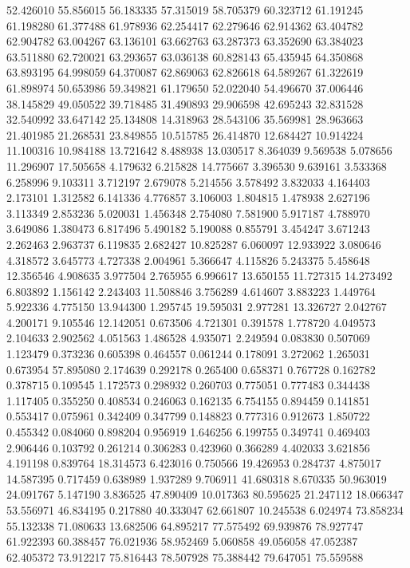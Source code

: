 52.426010
55.856015
56.183335
57.315019
58.705379
60.323712
61.191245
61.198280
61.377488
61.978936
62.254417
62.279646
62.914362
63.404782
62.904782
63.004267
63.136101
63.662763
63.287373
63.352690
63.384023
63.511880
62.720021
63.293657
63.036138
60.828143
65.435945
64.350868
63.893195
64.998059
64.370087
62.869063
62.826618
64.589267
61.322619
61.898974
50.653986
59.349821
61.179650
52.022040
54.496670
37.006446
38.145829
49.050522
39.718485
31.490893
29.906598
42.695243
32.831528
32.540992
33.647142
25.134808
14.318963
28.543106
35.569981
28.963663
21.401985
21.268531
23.849855
10.515785
26.414870
12.684427
10.914224
11.100316
10.984188
13.721642
8.488938
13.030517
8.364039
9.569538
5.078656
11.296907
17.505658
4.179632
6.215828
14.775667
3.396530
9.639161
3.533368
6.258996
9.103311
3.712197
2.679078
5.214556
3.578492
3.832033
4.164403
2.173101
1.312582
6.141336
4.776857
3.106003
1.804815
1.478938
2.627196
3.113349
2.853236
5.020031
1.456348
2.754080
7.581900
5.917187
4.788970
3.649086
1.380473
6.817496
5.490182
5.190088
0.855791
3.454247
3.671243
2.262463
2.963737
6.119835
2.682427
10.825287
6.060097
12.933922
3.080646
4.318572
3.645773
4.727338
2.004961
5.366647
4.115826
5.243375
5.458648
12.356546
4.908635
3.977504
2.765955
6.996617
13.650155
11.727315
14.273492
6.803892
1.156142
2.243403
11.508846
3.756289
4.614607
3.883223
1.449764
5.922336
4.775150
13.944300
1.295745
19.595031
2.977281
13.326727
2.042767
4.200171
9.105546
12.142051
0.673506
4.721301
0.391578
1.778720
4.049573
2.104633
2.902562
4.051563
1.486528
4.935071
2.249594
0.083830
0.507069
1.123479
0.373236
0.605398
0.464557
0.061244
0.178091
3.272062
1.265031
0.673954
57.895080
2.174639
0.292178
0.265400
0.658371
0.767728
0.162782
0.378715
0.109545
1.172573
0.298932
0.260703
0.775051
0.777483
0.344438
1.117405
0.355250
0.408534
0.246063
0.162135
6.754155
0.894459
0.141851
0.553417
0.075961
0.342409
0.347799
0.148823
0.777316
0.912673
1.850722
0.455342
0.084060
0.898204
0.956919
1.646256
6.199755
0.349741
0.469403
2.906446
0.103792
0.261214
0.306283
0.423960
0.366289
4.402033
3.621856
4.191198
0.839764
18.314573
6.423016
0.750566
19.426953
0.284737
4.875017
14.587395
0.717459
0.638989
1.937289
9.706911
41.680318
8.670335
50.963019
24.091767
5.147190
3.836525
47.890409
10.017363
80.595625
21.247112
18.066347
53.556971
46.834195
0.217880
40.333047
62.661807
10.245538
6.024974
73.858234
55.132338
71.080633
13.682506
64.895217
77.575492
69.939876
78.927747
61.922393
60.388457
76.021936
58.952469
5.060858
49.056058
47.052387
62.405372
73.912217
75.816443
78.507928
75.388442
79.647051
75.559588
